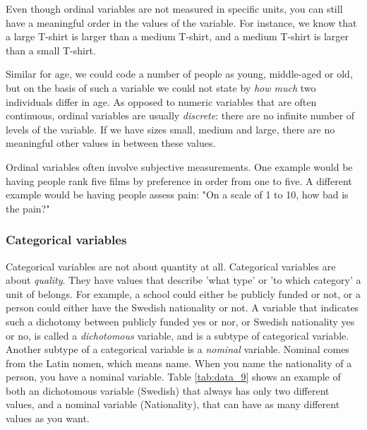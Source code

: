 Even though ordinal variables are not measured in specific units, you can still have a meaningful order in the values of the variable. For instance, we know that a large T-shirt is larger than a medium T-shirt, and a medium T-shirt is larger than a small T-shirt.

Similar for age, we could code a number of people as young, middle-aged or old, but on the basis of such a variable we could not state by \textit{how much} two individuals differ in age. As opposed to numeric variables that are often continuous, ordinal variables are usually \textit{discrete}: there are no infinite number of levels of the variable. If we have sizes small, medium and large, there are no meaningful other values in between these values.

Ordinal variables often involve subjective measurements. One example would be having people rank five films by preference in order from one to five. A different example would be having people assess pain: "On a scale of 1 to 10, how bad is the pain?"

\subsubsection{Categorical variables}

Categorical variables are not about quantity at all. Categorical variables are about \textit{quality}. They have values that describe 'what type' or 'to which category' a unit of belongs. For example, a school could either be publicly funded or not, or a person could either have the Swedish nationality or not. A variable that indicates such a dichotomy between publicly funded yes or nor, or Swedish nationality yes or no, is called a \textit{dichotomous} variable, and is a subtype of categorical variable. Another subtype of a categorical variable is a \textit{nominal} variable. Nominal comes from the Latin nomen, which means name. When you name the nationality of a person, you have a nominal variable. Table \ref{tab:data_9} shows an example of both an dichotomous variable (Swedish) that always has only two different values, and a nominal variable (Nationality), that can have as many different values as you want.

\begin{kframe}


{\ttfamily\noindent\bfseries{}}\end{kframe}

